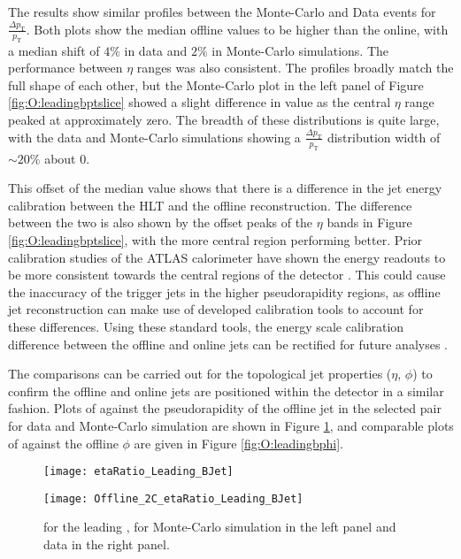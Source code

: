 		\newpage
		The results show similar profiles between the Monte-Carlo and Data events for $\frac{\Delta p_\text{T}}{p_\text{T}}$. Both plots show the median offline \pt values to be higher than the online, with a median shift of $4\%$ in data and $2\%$ in Monte-Carlo simulations. The performance between $\eta$ ranges was also consistent. The profiles broadly match the full shape of each other, but the Monte-Carlo plot in the left panel of Figure \ref{fig:O:leadingbptslice} showed a slight difference in \dptpt value as the central $\eta$ range peaked at approximately zero. The breadth of these distributions is quite large, with the data and Monte-Carlo simulations showing a $\frac{\Delta p_\text{T}}{p_\text{T}}$  distribution width of $\sim20\%$ about 0.

		This offset of the median \dptpt value shows that there is a difference in the jet energy calibration between the HLT and the offline reconstruction. The difference between the two is also shown by the offset peaks of the $\eta$ bands in Figure \ref{fig:O:leadingbptslice}, with the more central region performing better. Prior calibration studies of the ATLAS calorimeter have shown the energy readouts to be more consistent towards the central regions of the detector \cite{JES}. This could cause the inaccuracy of the trigger jets in the higher pseudorapidity regions, as offline jet reconstruction can make use of developed calibration tools to account for these differences. Using these standard tools, the energy scale calibration difference between the offline and online jets can be rectified for future analyses \cite{jetcalib, JES}.

		The \dxx comparisons can be carried out for the topological jet properties ($\eta$, $\phi$) to confirm the offline and online jets are positioned within the detector in a similar fashion. Plots of \dee against the pseudorapidity of the offline jet in the selected pair for data and Monte-Carlo simulation are shown in Figure \ref{fig:O:leadingbeta}, and comparable plots of \dphph against the offline $\phi$ are given in Figure \ref{fig:O:leadingbphi}.

		\begin{figure}[h]
			\centering
			\begin{minipage}[h]{0.48\linewidth}
				\texttt{[image: etaRatio\_Leading\_BJet]}

			\end{minipage}
			\quad
			\begin{minipage}[h]{0.48\linewidth}
				\texttt{[image: Offline\_2C\_etaRatio\_Leading\_BJet]}
			\end{minipage}
			\caption[\dee for the leading \bjet\ in data and Monte-Carlo simulations]{\dee for the leading \bjet, for Monte-Carlo simulation in the left panel and data in the right panel.}
			\label{fig:O:leadingbeta}
		\end{figure}

